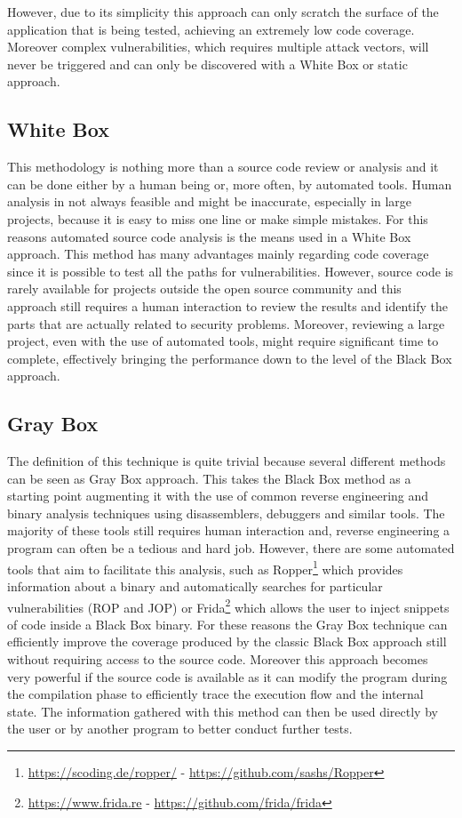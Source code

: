 \documentclass[../main.tex]{subfiles}
\begin{document}
However, due to its simplicity this approach can only scratch the surface of the
application that is being tested, achieving an extremely low code coverage. Moreover complex vulnerabilities, which requires multiple attack vectors, will never be triggered and can only be discovered with a White Box or static approach.

\subsection{White Box}

This methodology is nothing more than a source code review or analysis and it
can be done either by a human being or, more often, by automated tools. Human
analysis in not always feasible and might be inaccurate, especially in large
projects, because it is easy to miss one line or make simple mistakes. For this
reasons automated source code analysis is the means used in a White Box approach. This method has many advantages mainly regarding code coverage since it is possible to test all the paths for vulnerabilities. However, source code is rarely available for projects outside the open source community and this approach still requires a human interaction to review the results and identify the parts that are actually related to security problems. Moreover, reviewing a large project, even with the use of automated tools, might require significant time to complete, effectively bringing the performance down to the level of the Black Box approach.

\subsection{Gray Box}

The definition of this technique is quite trivial because several different
methods can be seen as Gray Box approach. This takes the Black Box method as a
starting point augmenting it with the use of common reverse engineering and
binary analysis techniques using disassemblers, debuggers and similar tools. The
majority of these tools still requires human interaction and, reverse
engineering a program can often be a tedious and hard job. However, there are
some automated tools that aim to facilitate this analysis, such as Ropper\footnote{\url{https://scoding.de/ropper/} - \url{https://github.com/sashs/Ropper}} which provides
information about a binary and automatically searches for particular
vulnerabilities (ROP and JOP) or Frida\footnote{\url{https://www.frida.re} - \url{https://github.com/frida/frida}} which allows the user to inject snippets of code inside a Black Box binary. For these reasons the Gray Box technique can efficiently improve the coverage produced by the classic Black Box approach still without requiring access to the source code. Moreover this approach becomes very powerful if the source code is available as it can modify the program during the compilation phase to efficiently trace the execution flow and the internal state. The information gathered with this method can then be used directly by the user or by another program to better conduct further tests.
\end{document}
